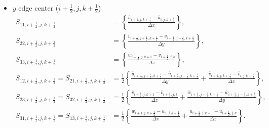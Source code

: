 \begin{itemize}
  \item $y$ edge center ($i+\frac{1}{2},j,k+\frac{1}{2}$)
    \begin{align}
      S_{11,i+\frac{1}{2},j,k+\frac{1}{2}} &= \left\{
      \frac{\overline{u}_{i+1,j,k+\frac{1}{2}}-\overline{u}_{i,j,k+\frac{1}{2}}}{\Delta x}
      \right\}, \\
      S_{22,i+\frac{1}{2},j,k+\frac{1}{2}} &= \left\{
      \frac{\overline{v}_{i+\frac{1}{2},j+\frac{1}{2},k+\frac{1}{2}}-\overline{v}_{i+\frac{1}{2},j-\frac{1}{2},k+\frac{1}{2}}}{\Delta y}
      \right\}, \\
      S_{33,i+\frac{1}{2},j,k+\frac{1}{2}} &= \left\{
      \frac{\overline{w}_{i+\frac{1}{2},j,k+1}-\overline{v}_{i+\frac{1}{2},j,k}}{\Delta z}
      \right\}, \\
      S_{12,i+\frac{1}{2},j,k+\frac{1}{2}} = S_{21,i+\frac{1}{2},j,k+\frac{1}{2}} &= \frac{1}{2}\left\{
      \frac{\overline{u}_{i+\frac{1}{2},j+\frac{1}{2},k+\frac{1}{2}}-\overline{u}_{i+\frac{1}{2},j-\frac{1}{2},k+\frac{1}{2}}}{\Delta y}
     +\frac{\overline{v}_{i+1,j,k+\frac{1}{2}}-\overline{v}_{i,j,k+\frac{1}{2}}}{\Delta x}
      \right\}, \\
      S_{23,i+\frac{1}{2},j,k+\frac{1}{2}} = S_{32,i+\frac{1}{2},j,k+\frac{1}{2}} &= \frac{1}{2}\left\{
      \frac{\overline{v}_{i+\frac{1}{2},j,k+1}-\overline{v}_{i+\frac{1}{2},j,k}}{\Delta z}
     +\frac{\overline{w}_{i+\frac{1}{2},j+\frac{1}{2},k+\frac{1}{2}}-\overline{w}_{i+\frac{1}{2},j-\frac{1}{2},k+\frac{1}{2}}}{\Delta y}
      \right\}, \\
      S_{31,i+\frac{1}{2},j,k+\frac{1}{2}} = S_{13,i+\frac{1}{2},j,k+\frac{1}{2}} &= \frac{1}{2}\left\{
      \frac{\overline{w}_{i+1,j,k+\frac{1}{2}}-\overline{w}_{i,j,k+\frac{1}{2}}}{\Delta x}
     +\frac{\overline{u}_{i+\frac{1}{2},j,k+1}-\overline{u}_{i+\frac{1}{2},j,k}}{\Delta z}
      \right\}.
    \end{align}


\end{itemize}
